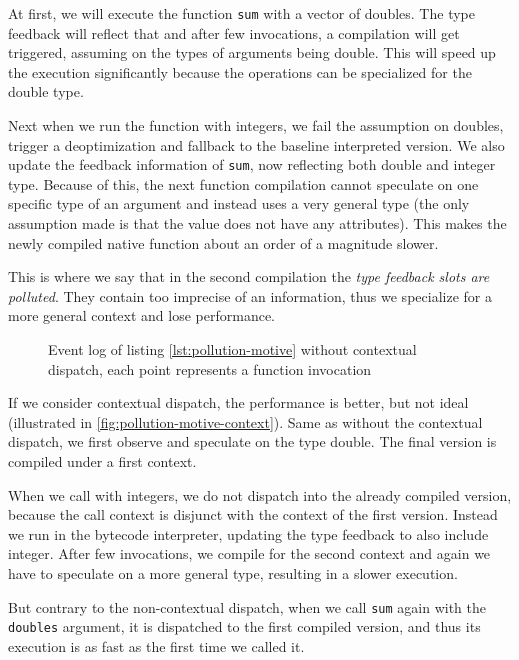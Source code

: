 At first, we will execute the function \texttt{sum} with a vector of doubles. The type feedback will reflect that and after few invocations, a compilation will get triggered, assuming on the types of arguments being double. This will speed up the execution significantly because the operations can be specialized for the double type.

Next when we run the function with integers, we fail the assumption on doubles, trigger a deoptimization and fallback to the baseline interpreted version. We also update the feedback information of \texttt{sum}, now reflecting both double and integer type. Because of this, the next function compilation cannot speculate on one specific type of an argument and instead uses a very general type (the only assumption made is that the value does not have any attributes). This makes the newly compiled native function about an order of a magnitude slower.

This is where we say that in the second compilation the \textit{type feedback slots are polluted}. They contain too imprecise of an information, thus we specialize for a more general context and lose performance.

\begin{figure}
	\centering
	\begin{adjustwidth}{-3cm}{-3cm}
	\end{adjustwidth}
	\caption{Event log of listing \ref{lst:pollution-motive} without contextual dispatch, each point represents a function invocation}\label{fig:pollution-motive-baseline}
\end{figure}

If we consider contextual dispatch, the performance is better, but not ideal (illustrated in \ref{fig:pollution-motive-context}). Same as without the contextual dispatch, we first observe and speculate on the type double. The final version is compiled under a first context.

When we call with integers, we do not dispatch into the already compiled version, because the call context is disjunct with the context of the first version. Instead we run in the bytecode interpreter, updating the type feedback to also include integer. After few invocations, we compile for the second context and again we have to speculate on a more general type, resulting in a slower execution.

But contrary to the non-contextual dispatch, when we call \texttt{sum} again with the \texttt{doubles} argument, it is dispatched to the first compiled version, and thus its execution is as fast as the first time we called it.


